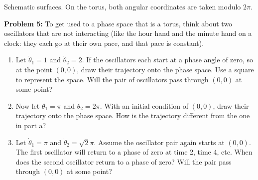 \documentclass[12pt]{amsart}
\theoremstyle{plain}
\theoremstyle{definition}
\theoremstyle{definition}
\theoremstyle{plain}
\begin{document}
    \begin{center}
\begin{minipage}{\linewidth}\centering
{}

{\small Schematic surfaces. On the torus, both angular coordinates are taken modulo $2\pi$.}
\end{minipage}
\end{center}

    \textbf{Problem 5:} To get used to a phase space that is a torus, think about two oscillators
    that are not interacting (like the hour hand and the minute hand on a clock: they each go at
    their own pace, and that pace is constant).

    \begin{enumerate}[label=(\alph*)]

\item Let $\dot{\theta}_1=1$ and $\dot{\theta}_2=2$. If the oscillators each start at a phase
angle of zero, so at the point $(0,0)$, draw their trajectory onto the phase space. Use a
square to represent the space. Will the pair of oscillators pass through $(0,0)$ at some point?

\item Now let $\dot{\theta}_1=\pi$ and $\dot{\theta}_2=2\pi$. With an initial condition of
$(0,0)$, draw their trajectory onto the phase space. How is the trajectory different from the
one in part a?

\item Let $\dot{\theta}_1=\pi$ and $\dot{\theta}_2=\sqrt{2}\pi$. Assume the oscillator pair
again starts at $(0,0)$. The first oscillator will return to a phase of zero at time 2, time 4,
etc. When does the second oscillator return to a phase of zero? Will the pair pass through
$(0,0)$ at some point?

    \end{enumerate}
\end{document}

